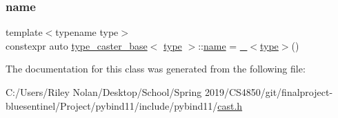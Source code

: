 \subsubsection{\texorpdfstring{name}{name}}
{\footnotesize\ttfamily template$<$typename type$>$ \\
constexpr auto \mbox{\hyperlink{classtype__caster__base}{type\+\_\+caster\+\_\+base}}$<$ \mbox{\hyperlink{_s_d_l__opengl_8h_ad5ddf6fca7b585646515660e810e0188}{type}} $>$\+::\mbox{\hyperlink{structname}{name}} = \mbox{\hyperlink{descr_8h_af114703e20c6527e87163eb2798f74b8}{\+\_\+}}$<$\mbox{\hyperlink{_s_d_l__opengl_8h_ad5ddf6fca7b585646515660e810e0188}{type}}$>$()\hspace{0.3cm}{\ttfamily [static]}}



The documentation for this class was generated from the following file\+:\begin{DoxyCompactItemize}
\item 
C\+:/\+Users/\+Riley Nolan/\+Desktop/\+School/\+Spring 2019/\+C\+S4850/git/finalproject-\/bluesentinel/\+Project/pybind11/include/pybind11/\mbox{\hyperlink{cast_8h}{cast.\+h}}\end{DoxyCompactItemize}
